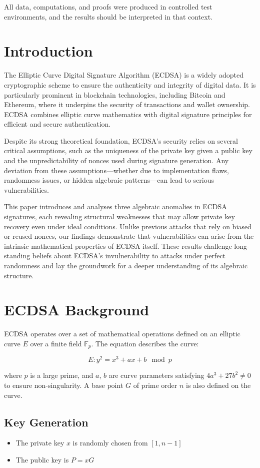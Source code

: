 \documentclass[11pt]{article}
\begin{document}
All data, computations, and proofs were produced in controlled test environments, and the results should be interpreted in that context.

\section{Introduction}
The Elliptic Curve Digital Signature Algorithm (ECDSA) is a widely adopted cryptographic scheme to ensure the authenticity and integrity of digital data. It is particularly prominent in blockchain technologies, including Bitcoin and Ethereum, where it underpins the security of transactions and wallet ownership. ECDSA combines elliptic curve mathematics with digital signature principles for efficient and secure authentication.

Despite its strong theoretical foundation, ECDSA's security relies on several critical assumptions, such as the uniqueness of the private key given a public key and the unpredictability of nonces used during signature generation. Any deviation from these assumptions—whether due to implementation flaws, randomness issues, or hidden algebraic patterns—can lead to serious vulnerabilities.

This paper introduces and analyses three algebraic anomalies in ECDSA signatures, each revealing structural weaknesses that may allow private key recovery even under ideal conditions. Unlike previous attacks that rely on biased or reused nonces, our findings demonstrate that vulnerabilities can arise from the intrinsic mathematical properties of ECDSA itself. These results challenge long-standing beliefs about ECDSA's invulnerability to attacks under perfect randomness and lay the groundwork for a deeper understanding of its algebraic structure.

\section{ECDSA Background}
ECDSA operates over a set of mathematical operations defined on an elliptic curve \( E \) over a finite field \( \mathbb{F}_p \). The equation describes the curve:

\[
E: y^2 = x^3 + ax + b \mod p
\]

where \( p \) is a large prime, and \( a \), \( b \) are curve parameters satisfying \( 4a^3 + 27b^2 \neq 0 \) to ensure non-singularity. A base point \( G \) of prime order \( n \) is also defined on the curve.

\subsection*{Key Generation}
\begin{itemize}
  \item The private key \( x \) is randomly chosen from \( [1, n-1] \)
  \item The public key is \( P = xG \)
\end{itemize}
\end{document}
